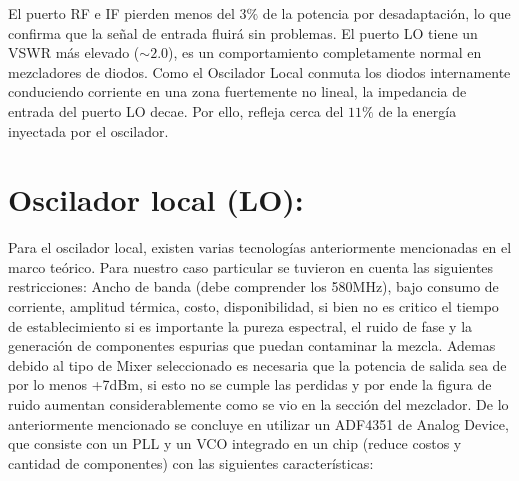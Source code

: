 \documentclass[11pt,a4paper,twoside]{report}
\begin{document}
	El puerto RF e IF pierden menos del $3\%$ de la potencia por desadaptación, lo que confirma que la señal de entrada fluirá sin problemas. El puerto LO tiene un VSWR más elevado ($\sim 2.0$), es un comportamiento completamente normal en mezcladores de diodos. Como el Oscilador Local conmuta los diodos internamente conduciendo corriente en una zona fuertemente no lineal, la impedancia de entrada del puerto LO decae. Por ello, refleja cerca del $11\%$ de la energía inyectada por el oscilador.\newpage
	
	\section{Oscilador local (LO):}
	Para el oscilador local, existen varias tecnologías anteriormente mencionadas en el marco teórico. Para nuestro caso particular se tuvieron en cuenta las siguientes restricciones: Ancho de banda (debe comprender los 580MHz), bajo consumo de corriente, amplitud térmica, costo, disponibilidad, si bien no es critico el tiempo de establecimiento si es importante la pureza espectral, el ruido de fase y la generación de componentes espurias que puedan contaminar la mezcla. Ademas debido al tipo de Mixer seleccionado es necesaria que la potencia de salida sea de por lo menos +7dBm, si esto no se cumple las perdidas y por ende la figura de ruido aumentan considerablemente como se vio en la sección del mezclador. De lo anteriormente mencionado se concluye en utilizar un ADF4351 de Analog Device, que consiste con un PLL y un VCO integrado en un chip (reduce costos y cantidad de componentes) con las siguientes características:
	
\end{document}
